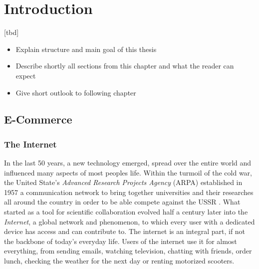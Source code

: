 \chapter{Introduction}

[tbd]

\begin{itemize}
	\item Explain structure and main goal of this thesis
	\item Describe shortly all sections from this chapter and what the reader can expect
	\item Give short outlook to following chapter
\end{itemize}






\section{E-Commerce}


\subsection{The Internet}

In the last 50 years, a new technology emerged, spread over the entire world and influenced many aspects of most peoples life.
Within the turmoil of the cold war, the United State's \textit{Advanced Research Projects Agency} (ARPA) established in 1957 a communication network to bring together universities and their researches all around the country in order to be able compete against the USSR \cite{2011Cohen}.
What started as a tool for scientific collaboration evolved half a century later into the \textit{Internet}, a global network and phenomenon, to which every user with a dedicated device has access and can contribute to.
The internet is an integral part, if not the backbone of today's everyday life.
Users of the internet use it for almost everything, from sending emails, watching television, chatting with friends,  order lunch, checking the weather for the next day or renting motorized scooters.

